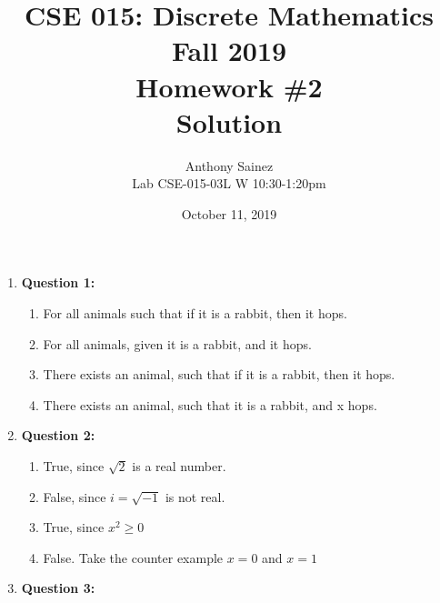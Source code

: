 \documentclass[11pt]{article}
\begin{document}
\author{Anthony Sainez\\
Lab CSE-015-03L W 10:30-1:20pm}

\title{CSE 015: Discrete Mathematics\\
Fall 2019\\
Homework \#2\\
Solution}

\date{October 11, 2019}
\maketitle

\begin{enumerate}

\item
\textbf{Question 1:}

\begin{enumerate}[label=(\alph*)]
\item
For all animals such that if it is a rabbit, then it hops.

\item
For all animals, given it is a rabbit, and it hops.

\item
There exists an animal, such that if it is a rabbit, then it hops.

\item
There exists an animal, such that it is a rabbit, and x hops.

\end{enumerate}

\item
\textbf{Question 2:}

\begin{enumerate}[label=(\alph*)]
\item
True, since $\sqrt{2}$ is a real number.

\item
False, since $i=\sqrt{-1}$ is not real.

\item
True, since $x^2 \geq 0$

\item
False. Take the counter example $x=0$ and $x=1$

\end{enumerate}

\item
\textbf{Question 3:}


\end{enumerate}
\end{document}
